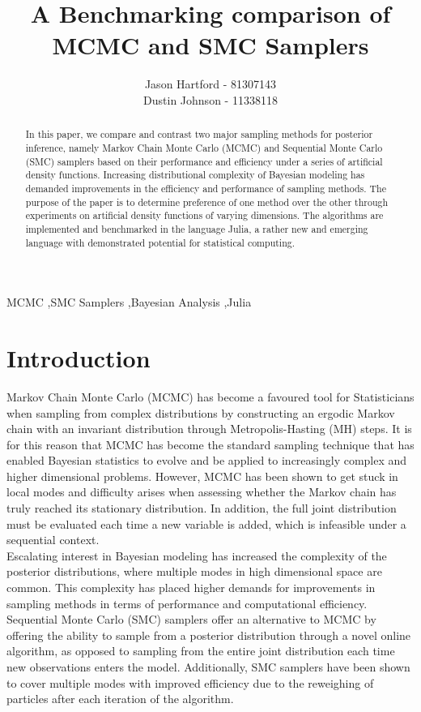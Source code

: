 \documentclass[12pt]{elsarticle}
\begin{document}
	
\begin{frontmatter}
\title{A Benchmarking comparison of MCMC and SMC Samplers}
\author{Jason Hartford - 81307143 \\ Dustin Johnson - 11338118}

\begin{abstract}
In this paper, we compare and contrast two major sampling methods for posterior inference, namely Markov Chain Monte Carlo (MCMC) and Sequential Monte Carlo (SMC) samplers based on their performance and efficiency under a series of artificial density functions. Increasing distributional complexity of Bayesian modeling has demanded improvements in the efficiency and performance of sampling methods.  The purpose of the paper is to determine preference of one method over the other through experiments on artificial density functions of varying dimensions. The algorithms are implemented and benchmarked in the language Julia, a rather new and emerging language with demonstrated potential for statistical computing.
\end{abstract}

\begin{keyword}
MCMC \sep SMC Samplers \sep Bayesian Analysis \sep Julia
\end{keyword}

\end{frontmatter}



\section*{Introduction}
Markov Chain Monte Carlo (MCMC) has become a favoured tool for Statisticians when sampling from complex distributions by constructing an ergodic Markov chain with an invariant distribution through Metropolis-Hasting (MH) steps. It is for this reason that MCMC has become the standard sampling technique that has enabled Bayesian statistics to evolve and be applied to increasingly complex and higher dimensional problems. However, MCMC has been shown to get stuck in local modes and difficulty arises when assessing whether the Markov chain has truly reached its stationary distribution. In addition, the full joint distribution must be evaluated each time a new variable is added, which is infeasible under a sequential context. \\

Escalating interest in Bayesian modeling has increased the complexity of the posterior distributions, where multiple modes in high dimensional space are common. This complexity has placed higher demands for improvements in sampling methods in terms of performance and computational efficiency. Sequential Monte Carlo (SMC) samplers offer an alternative to MCMC by offering the ability to sample from a posterior distribution through a novel online algorithm, as opposed to sampling from the entire joint distribution each time new observations enters the model.  Additionally, SMC samplers have been shown to cover multiple modes with improved efficiency due to the reweighing of particles after each iteration of the algorithm. \\
\end{document}
